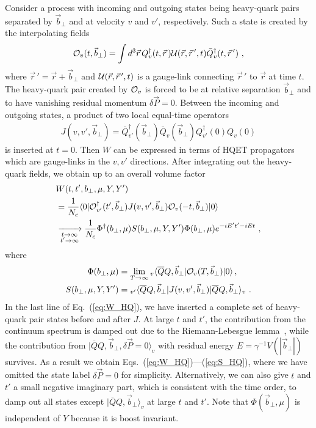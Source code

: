 \documentclass[aps,rmp,reprint,amsmath,amssymb,graphicx,longbibliography]{revtex4-1} %
\newcommand{\nn}{\nonumber}
\begin{document}
Consider a process with incoming and outgoing states being heavy-quark pairs separated by ${\vec b}_\perp$ and at velocity $v$ and $v'$, respectively.
%
Such a state is created by the interpolating fields
\begin{align}
	{\cal O}_v(t,{\vec b}_\perp)=\int d^3\vec r \, Q_v^{\dagger}(t,\vec r\,) {\cal U}(\vec r,\vec r\,',t) \bar Q_v^{\dagger}(t,\vec r\,')  \ ,
\end{align}
where $\vec r\,'=\vec r+\vec b_\perp$ and ${\cal U}(\vec r,\vec r\,',t)$ is a gauge-link connecting $\vec r\,'$ to $\vec r$ at time $t$.
%
The heavy-quark pair created by ${\cal O}_v$ is forced to be at relative separation $\vec{b}_\perp$ and to have vanishing residual momentum $\delta \vec P=0$.
%
Between the incoming and outgoing states, a product of two local equal-time operators
\begin{align}
	J(v,v',\vec{b}_\perp)= \bar Q^\dagger_{v'}(\vec{b}_\perp)\bar Q_v(\vec{b}_\perp)Q_{v'}^\dagger(0)Q_v(0)
\end{align}
is inserted at $t=0$.
%
Then $W$ can be expressed in terms of HQET propagators which are gauge-links in the $v,v'$ directions.
%
After integrating out the heavy-quark fields, we obtain up to an overall volume factor~\cite{Ji:2019sxk}
\begin{align}\label{eq:W_HQ}
	&W(t,t',b_\perp,\mu,Y,Y')  \\
	&=\frac{1}{N_c} \langle0|{\cal O}^{\dagger}_{v'}(t',{\vec b}_\perp) J(v,v',\vec{b}_\perp) {\cal O}_v(-t,\vec{b}_\perp)|0\rangle \nonumber\\
	&\xrightarrow[\substack{t\to\infty\\t'\to\infty}]{} \frac{1}{N_c}\Phi^\dagger(b_\perp,\mu) S(b_\perp,\mu,Y,Y') \Phi(b_\perp,\mu)e^{-iE't'-iEt}  \ , \nn
\end{align}
where
\begin{align}\label{eq:S_HQ}
	\Phi(b_\perp,\mu)&=\lim_{T\to\infty}{}_v\langle \overline QQ,\vec{b}_\perp|{\cal O}_v(T,\vec{b}_\perp)|0\rangle\,,\\
	S(b_\perp,\mu,Y,Y')&={{}_{v'}}\langle\overline QQ,\vec{b}_\perp|J(v,v',\vec{b}_\perp)|\overline QQ,\vec{b}_\perp\rangle_v \ . \nn
\end{align}
%
In the last line of Eq.~(\ref{eq:W_HQ}), we have inserted a complete set of heavy-quark pair states before and after $J$.
%
At large $t$ and $t'$, the contribution from the continuum spectrum is damped out due to the Riemann-Lebesgue lemma~\cite{zuazo2001fourier}, while the contribution from $|\overline QQ,\vec{b}_\perp,\delta \vec{P}=0\rangle_v$ with residual energy $E=\gamma^{-1}V(|\vec b_\perp|)$ survives.
%
As a result we obtain Eqs.~(\ref{eq:W_HQ})---(\ref{eq:S_HQ}), where we have omitted the state label $\delta \vec{P}=0$ for simplicity.
%
Alternatively, we can also give $t$ and $t'$ a small negative imaginary part, which is consistent with the time order, to damp out all states except $|\overline QQ,\vec{b}_\perp\rangle_v$ at large $t$ and $t'$.
%
Note that $\Phi(\vec{b}_\perp,\mu)$ is independent of $Y$ because it is boost invariant.
\end{document}
